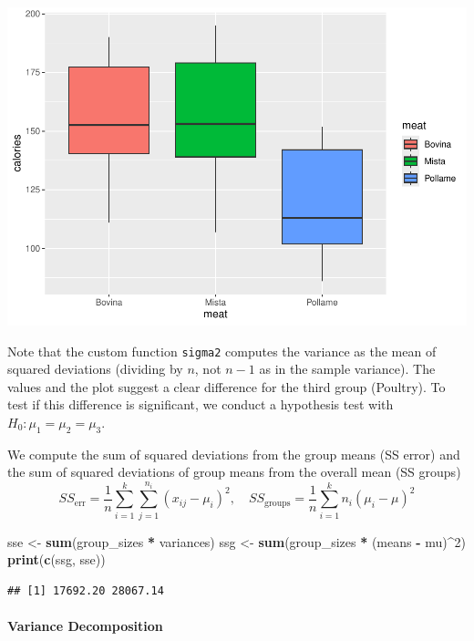 \documentclass[
]{article}
\newenvironment{Shaded}{\begin{snugshade}}{\end{snugshade}}
\newcommand{\DecValTok}[1]{\textcolor[rgb]{0.00,0.00,0.81}{#1}}
\newcommand{\FunctionTok}[1]{\textcolor[rgb]{0.13,0.29,0.53}{\textbf{#1}}}
\newcommand{\NormalTok}[1]{#1}
\newcommand{\OtherTok}[1]{\textcolor[rgb]{0.56,0.35,0.01}{#1}}
\newcommand{\SpecialCharTok}[1]{\textcolor[rgb]{0.81,0.36,0.00}{\textbf{#1}}}
\begin{document}
\includegraphics{Tests_and_Applications_files/figure-latex/unnamed-chunk-22-2.pdf}

Note that the custom function \texttt{sigma2} computes the variance as
the mean of squared deviations (dividing by \(n\), not \(n-1\) as in the
sample variance). The values and the plot suggest a clear difference for
the third group (Poultry). To test if this difference is significant, we
conduct a hypothesis test with \(H_0: \mu_1 = \mu_2 = \mu_3\).

We compute the sum of squared deviations from the group means (SS error)
and the sum of squared deviations of group means from the overall mean
(SS groups) \[
  SS_{\text{err}} = \frac{1}{n} \sum_{i=1}^k \sum_{j=1}^{n_i} (x_{ij} - \mu_i)^2, \quad 
  SS_{\text{groups}} = \frac{1}{n} \sum_{i=1}^k n_i (\mu_i - \mu)^2
  \]

\begin{Shaded}
\begin{Highlighting}[]
\NormalTok{sse }\OtherTok{\textless{}{-}} \FunctionTok{sum}\NormalTok{(group\_sizes }\SpecialCharTok{*}\NormalTok{ variances)}
\NormalTok{ssg }\OtherTok{\textless{}{-}} \FunctionTok{sum}\NormalTok{(group\_sizes }\SpecialCharTok{*}\NormalTok{ (means }\SpecialCharTok{{-}}\NormalTok{ mu)}\SpecialCharTok{\^{}}\DecValTok{2}\NormalTok{)}
\FunctionTok{print}\NormalTok{(}\FunctionTok{c}\NormalTok{(ssg, sse))}
\end{Highlighting}
\end{Shaded}

\begin{verbatim}
## [1] 17692.20 28067.14
\end{verbatim}

\hypertarget{variance-decomposition}{%
\paragraph{Variance Decomposition}\label{variance-decomposition}}
\end{document}
